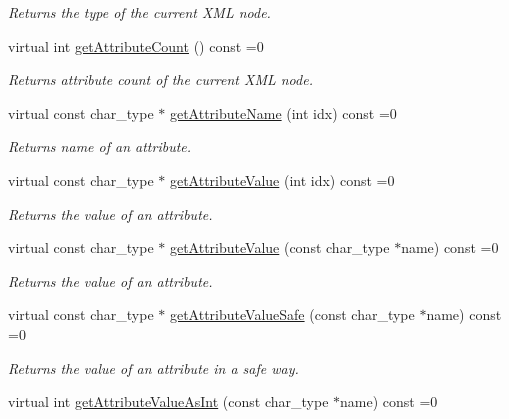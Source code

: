 \begin{DoxyCompactItemize}
\begin{DoxyCompactList}\small\item\em Returns the type of the current X\+M\+L node. \end{DoxyCompactList}\item 
virtual int \hyperlink{classirr_1_1io_1_1_i_irr_x_m_l_reader_aeaa1cfc860be7b788f78edec403cc2a2}{get\+Attribute\+Count} () const =0
\begin{DoxyCompactList}\small\item\em Returns attribute count of the current X\+M\+L node. \end{DoxyCompactList}\item 
virtual const char\+\_\+type $\ast$ \hyperlink{classirr_1_1io_1_1_i_irr_x_m_l_reader_aa0807dc565c67fcf355e656df1a326ef}{get\+Attribute\+Name} (int idx) const =0
\begin{DoxyCompactList}\small\item\em Returns name of an attribute. \end{DoxyCompactList}\item 
virtual const char\+\_\+type $\ast$ \hyperlink{classirr_1_1io_1_1_i_irr_x_m_l_reader_a41bd71a1b9d4a80cd1d0257dedb35325}{get\+Attribute\+Value} (int idx) const =0
\begin{DoxyCompactList}\small\item\em Returns the value of an attribute. \end{DoxyCompactList}\item 
virtual const char\+\_\+type $\ast$ \hyperlink{classirr_1_1io_1_1_i_irr_x_m_l_reader_adaac9a49b396e7fc2d335335f36391a9}{get\+Attribute\+Value} (const char\+\_\+type $\ast$name) const =0
\begin{DoxyCompactList}\small\item\em Returns the value of an attribute. \end{DoxyCompactList}\item 
virtual const char\+\_\+type $\ast$ \hyperlink{classirr_1_1io_1_1_i_irr_x_m_l_reader_a7674852b2e24b2710b90aab10ef1fc22}{get\+Attribute\+Value\+Safe} (const char\+\_\+type $\ast$name) const =0
\begin{DoxyCompactList}\small\item\em Returns the value of an attribute in a safe way. \end{DoxyCompactList}\item 
virtual int \hyperlink{classirr_1_1io_1_1_i_irr_x_m_l_reader_ab37bef58865355a7dba0011a38e6c8e7}{get\+Attribute\+Value\+As\+Int} (const char\+\_\+type $\ast$name) const =0

\end{DoxyCompactItemize}
